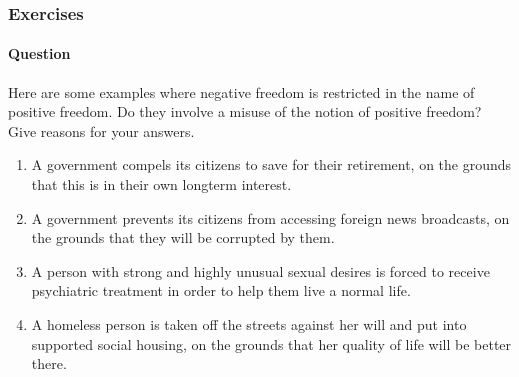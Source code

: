 \documentclass[letterpaper,10pt,english]{sphinxmanual}
\begin{document}
\subsubsection{Exercises}
\label{\detokenize{content/session_00/Part_00_02:id4}}

\paragraph{Question}
\label{\detokenize{content/session_00/Part_00_02:id5}}
Here are some examples where negative freedom is restricted in the name of positive freedom. Do they involve a misuse of the notion of positive freedom? Give reasons for your answers.
\begin{enumerate}
%
\item {} 
A government compels its citizens to save for their retirement, on the grounds that this is in their own long\sphinxhyphen{}term interest.

\item {} 
A government prevents its citizens from accessing foreign news broadcasts, on the grounds that they will be corrupted by them.

\item {} 
A person with strong and highly unusual sexual desires is forced to receive psychiatric treatment in order to help them live a normal life.

\item {} 
A homeless person is taken off the streets against her will and put into supported social housing, on the grounds that her quality of life will be better there.

\end{enumerate}
\end{document}
